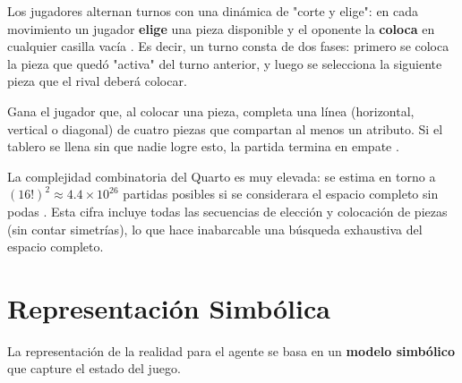 \documentclass[conference]{IEEEtran}
\begin{document}
Los jugadores alternan turnos con una dinámica de "corte y elige": en cada movimiento un jugador \textbf{elige} una pieza disponible y el oponente la \textbf{coloca} en cualquier casilla vacía \cite{santana2012}. Es decir, un turno consta de dos fases: primero se coloca la pieza que quedó "activa" del turno anterior, y luego se selecciona la siguiente pieza que el rival deberá colocar.

Gana el jugador que, al colocar una pieza, completa una línea (horizontal, vertical o diagonal) de cuatro piezas que compartan al menos un atributo. Si el tablero se llena sin que nadie logre esto, la partida termina en empate \cite{muller2009}.



La complejidad combinatoria del Quarto es muy elevada: se estima en torno a $(16!)^2 \approx 4.4 \times 10^{26}$ partidas posibles si se considerara el espacio completo sin podas \cite{santana2012}. Esta cifra incluye todas las secuencias de elección y colocación de piezas (sin contar simetrías), lo que hace inabarcable una búsqueda exhaustiva del espacio completo.



\section{Representación Simbólica}

La representación de la realidad para el agente se basa en un \textbf{modelo simbólico} que capture el estado del juego.
\end{document}
